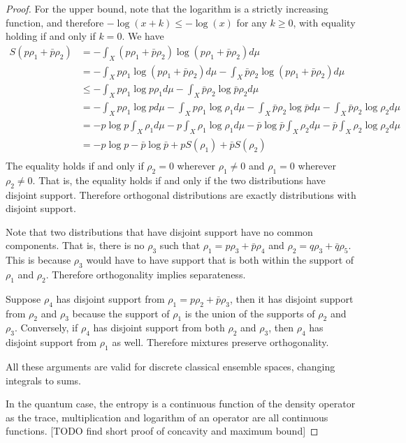 \begin{proof}
	For the upper bound, note that the logarithm is a strictly increasing function, and therefore $- \log(x + k) \leq -\log(x)$ for any $k \geq 0$, with equality holding if and only if $k=0$. We have
	\begin{equation}
		\begin{aligned}
			S(p\rho_1 + \bar{p}\rho_2) &= - \int_X \left(p\rho_1 + \bar{p}\rho_2\right) \log \left(p\rho_1 + \bar{p}\rho_2\right) d\mu \\
			&= - \int_X p\rho_1 \log \left(p\rho_1 + \bar{p}\rho_2\right) d\mu - \int_X \bar{p}\rho_2 \log \left(p\rho_1 + \bar{p}\rho_2\right) d\mu \\
			&\leq  - \int_X p\rho_1 \log p\rho_1 d\mu - \int_X \bar{p}\rho_2 \log \bar{p}\rho_2 d\mu\\
			&=  - \int_X p\rho_1 \log p d\mu - \int_X p\rho_1 \log \rho_1 d\mu - \int_X \bar{p}\rho_2 \log \bar{p} d\mu - \int_X \bar{p}\rho_2 \log \rho_2 d\mu\\
			&=  - p \log p \int_X \rho_1 d\mu - p \int_X \rho_1 \log \rho_1 d\mu - \bar{p} \log \bar{p} \int_X \rho_2 d\mu - \bar{p} \int_X \rho_2 \log \rho_2 d\mu\\
			&=  - p \log p - \bar{p} \log \bar{p} + p S(\rho_1) + \bar{p} S(\rho_2)\\
		\end{aligned}
	\end{equation}
	The equality holds if and only if $\rho_2=0$ wherever $\rho_1\neq0$ and $\rho_1=0$ wherever $\rho_2\neq0$. That is, the equality holds if and only if the two distributions have disjoint support. Therefore orthogonal distributions are exactly distributions with disjoint support.
	
	Note that two distributions that have disjoint support have no common components. That is, there is no $\rho_3$ such that $\rho_1 = p \rho_3 + \bar{p} \rho_4$ and $\rho_2 = q \rho_3 + \bar{q} \rho_5$. This is because $\rho_3$ would have to have support that is both within the support of $\rho_1$ and $\rho_2$. Therefore orthogonality implies separateness.
	
	Suppose $\rho_4$ has disjoint support from $\rho_1 = p \rho_2 + \bar{p} \rho_3$, then it has disjoint support from $\rho_2$ and $\rho_3$ because the support of $\rho_1$ is the union of the supports of $\rho_2$ and $\rho_3$. Conversely, if $\rho_4$ has disjoint support from both $\rho_2$ and $\rho_3$, then $\rho_4$ has disjoint support from $\rho_1$ as well. Therefore mixtures preserve orthogonality.
	
	All these arguments are valid for discrete classical ensemble spaces, changing integrals to sums.
	
	In the quantum case, the entropy is a continuous function of the density operator as the trace, multiplication and logarithm of an operator are all continuous functions. [TODO find short proof of concavity and maximum bound]
\end{proof}

